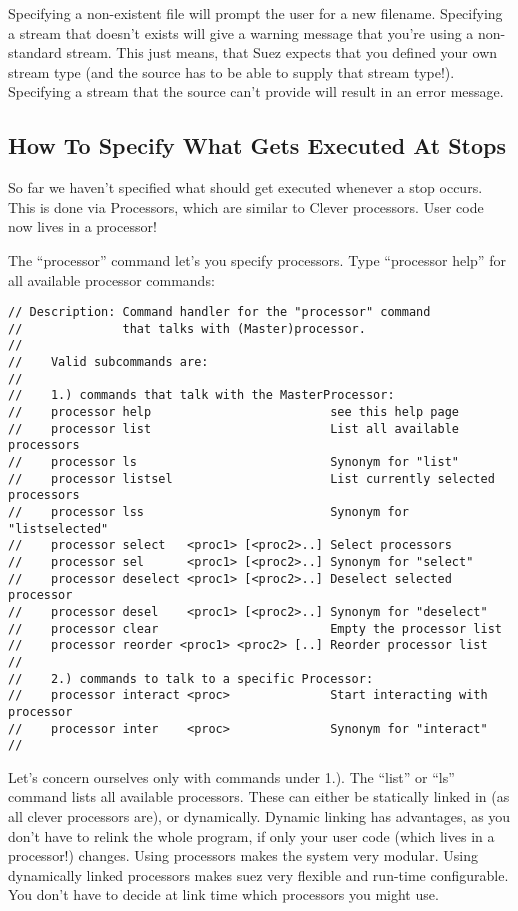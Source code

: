 \documentclass[12pt]{article}
\begin{document}
Specifying a non-existent file will prompt the user for a new
filename. Specifying a stream that doesn't exists will give a warning
message that you're using a non-standard stream. This just means, that
Suez expects that you defined your own stream type (and the source has
to be able to supply that stream type!). Specifying a stream
that the source can't provide will result in an error message.



\subsection{How To Specify What Gets Executed At Stops}
\label{sec:tutorial-processors}

So far we haven't specified what should get executed whenever a stop
occurs. This is done via Processors, which are similar to Clever
processors. User code now lives in a processor!

The ``processor'' command let's you specify processors.
Type ``processor help'' for all available processor commands:
%
\begin{verbatim}
// Description: Command handler for the "processor" command
//              that talks with (Master)processor.
//
//    Valid subcommands are:
//
//    1.) commands that talk with the MasterProcessor:
//    processor help                         see this help page
//    processor list                         List all available processors
//    processor ls                           Synonym for "list"
//    processor listsel                      List currently selected processors
//    processor lss                          Synonym for "listselected"
//    processor select   <proc1> [<proc2>..] Select processors
//    processor sel      <proc1> [<proc2>..] Synonym for "select"
//    processor deselect <proc1> [<proc2>..] Deselect selected processor
//    processor desel    <proc1> [<proc2>..] Synonym for "deselect"
//    processor clear                        Empty the processor list
//    processor reorder <proc1> <proc2> [..] Reorder processor list
//
//    2.) commands to talk to a specific Processor:
//    processor interact <proc>              Start interacting with processor
//    processor inter    <proc>              Synonym for "interact"
//
\end{verbatim}
%
Let's concern ourselves only with commands under 1.). The ``list'' or ``ls''
command lists all available processors. These can either be statically
linked in (as all clever processors are), or dynamically. Dynamic
linking has advantages, as you don't have to relink the whole program,
if only your user code (which lives in a processor!) changes. Using
processors makes the system very modular. Using dynamically linked
processors makes suez very flexible and run-time configurable. You don't
have to decide at link time which processors you might use.
\end{document}
